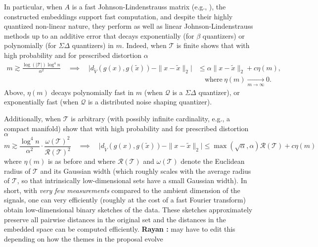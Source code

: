 \documentclass{article}
\newcommand{\comment}[3]{{\color{#1} {\bf #2 :} #3}}
\newcommand{\yoav}[1]{\comment{magenta}{Yoav}{#1}}
\newcommand{\rayan}[1]{\comment{red}{Rayan}{#1}}
\newcommand{\rad}{\mathcal{R}}
\begin{document}
In particular, when $A$ is a fast Johnson-Lindenstrauss matrix (e.g., \cite{}), the constructed embeddings support fast computation, and despite their highly quantized non-linear nature, they perform as well as linear Johnson-Lindenstrauss methods up to an additive error that decays exponentially (for $\beta$ quantizers) or polynomially (for $\Sigma\Delta$ quantizers)  in $m$. 
{Indeed, when $\mathcal{T}$ is finite} \cite{} shows that with high probability %
and for prescribed distortion $\alpha$
\begin{align*} m \gtrsim \frac{\log{(|\mathcal{T}|)} \log^4 n}{\alpha^2} \quad \implies  \quad \big|d_{\widetilde{V}}(g(x), g(\tilde{x})) - \|x - \tilde{x}\|_2\big| & \leq {\alpha}\|x - \tilde{x}\|_2 + c\eta(m), \\ &\quad\text{where} \ \eta(m) \xrightarrow[m \rightarrow \infty]{} 0. \end{align*}
Above, $\eta(m)$ decays polynomially fast in $m$ (when $\mathcal{Q}$ is a $\Sigma\Delta$ quantizer), or exponentially fast (when $\mathcal{Q}$ is a distributed noise shaping quantizer). %

{Additionally, when $\mathcal{T}$ is arbitrary (with possibly infinite cardinality, e.g., a compact manifold)} \cite{} show that with high probability  and for prescribed distortion $\alpha$
\[ m \gtrsim \frac{\log^4 n}{\alpha^2}\cdot\frac{\omega(\mathcal{T})^2}{\rad(\mathcal{T})^2} \quad \implies \quad \big|d_{\widetilde{V}}(g(x), g(\tilde{x})) - \|x - \tilde{x}\|_2\big| \leq \max(\sqrt{\alpha},\alpha) \rad(\mathcal{T}) + c\eta(m)\]
where $\eta(m)$ is as before and where $\rad(\mathcal{T})$ and $\omega(\mathcal{T})$ denote  the Euclidean radius of  $\mathcal{T}$ and its Gaussian width (which roughly scales with the average radius of $\mathcal{T}$, so that intrinsically low-dimensional sets have a small Gaussian width).%
 In short, with \emph{very few measurements} compared to the ambient dimension of the signals, one can very efficiently (roughly at the cost of a fast Fourier transform) obtain low-dimensional binary sketches of the data. These sketches approximately preserve all pairwise distances in the original set and the distances in the embedded space can be computed efficiently.  
\rayan{may have to edit this depending on how the themes in the proposal evolve}
\end{document}
